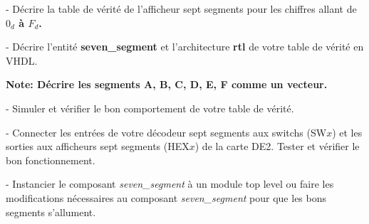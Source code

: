 \medskip

- Décrire la table de vérité de l'afficheur sept segments pour les chiffres allant de \textbf{$0_d$ à $F_d$.}

\medskip

- Décrire l'entité \textbf{seven\_segment} et l'architecture \textbf{rtl} de votre table de vérité en VHDL. 

\textbf{Note: Décrire les segments A, B, C, D, E, F comme un vecteur.}

\medskip

- Simuler et vérifier le bon comportement de votre table de vérité.

\medskip

- Connecter les entrées de votre décodeur sept segments aux switchs (SW$x$) et les sorties aux afficheurs sept segments (HEX$x$) de la carte DE2. Tester et vérifier le bon fonctionnement.

\medskip

- Instancier le composant \textit{seven\_segment} à un module top level ou faire les modifications nécessaires au composant \textit{seven\_segment} pour que les bons segments s'allument.
